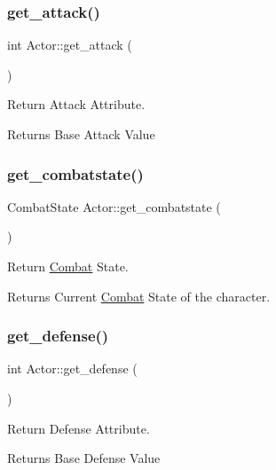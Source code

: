 \subsubsection{\texorpdfstring{get\+\_\+attack()}{get\_attack()}}
{\footnotesize\ttfamily int Actor\+::get\+\_\+attack (\begin{DoxyParamCaption}{ }\end{DoxyParamCaption})}



Return Attack Attribute. 

\begin{DoxyReturn}{Returns}
Base Attack Value 
\end{DoxyReturn}
\mbox{\label{classActor_a15f8173b7ac5479a1547f842d5fc474b}} 
\subsubsection{\texorpdfstring{get\+\_\+combatstate()}{get\_combatstate()}}
{\footnotesize\ttfamily Combat\+State Actor\+::get\+\_\+combatstate (\begin{DoxyParamCaption}{ }\end{DoxyParamCaption})}



Return \mbox{\hyperlink{classCombat}{Combat}} State. 

\begin{DoxyReturn}{Returns}
Current \mbox{\hyperlink{classCombat}{Combat}} State of the character. 
\end{DoxyReturn}
\mbox{\label{classActor_a9ad76549333736c7b76a4b78bf46cc17}} 
\subsubsection{\texorpdfstring{get\+\_\+defense()}{get\_defense()}}
{\footnotesize\ttfamily int Actor\+::get\+\_\+defense (\begin{DoxyParamCaption}{ }\end{DoxyParamCaption})}



Return Defense Attribute. 

\begin{DoxyReturn}{Returns}
Base Defense Value 
\end{DoxyReturn}
\mbox{\label{classActor_a32de439dc3ba0d36ae913b173b4b633f}} 
